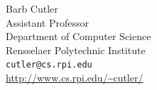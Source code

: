 \documentclass{thesis}
\begin{document}
Barb Cutler\\
Assistant Professor\\
Department of Computer Science\\
Rensselaer Polytechnic Institute\\
{\tt cutler@cs.rpi.edu}\\
\url{http://www.cs.rpi.edu/~cutler/}\\
%
%
\end{document}
